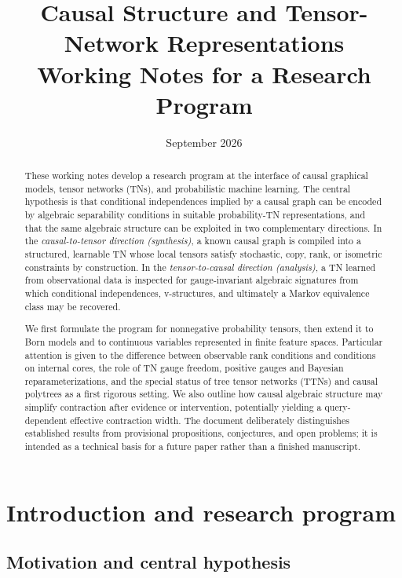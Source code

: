 \documentclass[11pt]{article}
\title{\textbf{Causal Structure and Tensor-Network Representations}\\[0.4em]\large Working Notes for a Research Program}
\author{}
\date{September 2026}
\theoremstyle{remark}
\begin{document}
\maketitle

\begin{abstract}
These working notes develop a research program at the interface of causal graphical models, tensor networks (TNs), and probabilistic machine learning. The central hypothesis is that conditional independences implied by a causal graph can be encoded by algebraic separability conditions in suitable probability-TN representations, and that the same algebraic structure can be exploited in two complementary directions. In the \emph{causal-to-tensor direction (synthesis)}, a known causal graph is compiled into a structured, learnable TN whose local tensors satisfy stochastic, copy, rank, or isometric constraints by construction. In the \emph{tensor-to-causal direction (analysis)}, a TN learned from observational data is inspected for gauge-invariant algebraic signatures from which conditional independences, v-structures, and ultimately a Markov equivalence class may be recovered.

We first formulate the program for nonnegative probability tensors, then extend it to Born models and to continuous variables represented in finite feature spaces. Particular attention is given to the difference between observable rank conditions and conditions on internal cores, the role of TN gauge freedom, positive gauges and Bayesian reparameterizations, and the special status of tree tensor networks (TTNs) and causal polytrees as a first rigorous setting. We also outline how causal algebraic structure may simplify contraction after evidence or intervention, potentially yielding a query-dependent effective contraction width. The document deliberately distinguishes established results from provisional propositions, conjectures, and open problems; it is intended as a technical basis for a future paper rather than a finished manuscript.
\end{abstract}

\tableofcontents
\newpage

\section{Introduction and research program}
\label{sec:intro}

\subsection{Motivation and central hypothesis}
\end{document}
